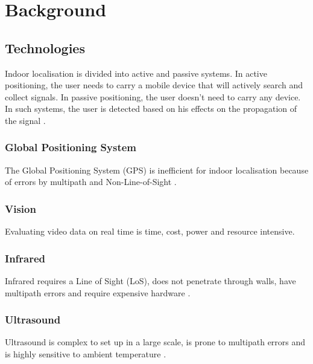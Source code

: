 \chapter{Background}

\section{Technologies}


Indoor localisation is divided into active and passive systems. In active positioning, the user needs to carry a mobile device that will actively search and collect signals. In passive positioning, the user doesn't need to carry any device. In such systems, the user is detected based on his effects on the propagation of the signal \cite{liu_survey_2020}. 

\subsection{Global Positioning System}

The Global Positioning System (GPS) is inefficient for indoor localisation because of errors by multipath and Non-Line-of-Sight \cite{mainetti_survey_2014}.

\subsection{Vision}

Evaluating video data on real time is time, cost, power and resource intensive.

\subsection{Infrared}

Infrared requires a Line of Sight (LoS), does not penetrate through walls, have multipath errors and require expensive hardware \cite{mainetti_survey_2014}.

\subsection{Ultrasound}

Ultrasound is complex to set up in a large scale, is prone to multipath errors and is highly sensitive to ambient temperature \cite{mainetti_survey_2014}.

